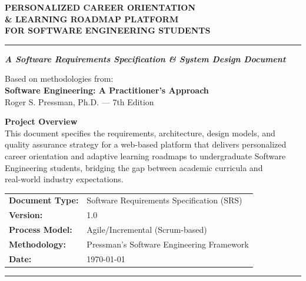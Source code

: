 \documentclass[12pt,a4paper]{report}
\begin{document}
	\begin{titlepage}
		\centering
		\vspace*{1.5cm}
		
		{\Huge\bfseries\color{primaryblue}
			PERSONALIZED CAREER ORIENTATION\\[0.4em]
			\& LEARNING ROADMAP PLATFORM\\[0.3em]
			FOR SOFTWARE ENGINEERING STUDENTS
			\par}
		
		\vspace{1cm}
		\rule{\textwidth}{1.5pt}
		
		\vspace{0.8cm}
		{\large\bfseries\textit{A Software Requirements Specification \& System Design Document}}
		
		\vspace{0.6cm}
		{\normalsize Based on methodologies from:}\\[0.3em]
		{\large\textbf{Software Engineering: A Practitioner's Approach}\\
			Roger S. Pressman, Ph.D. --- 7th Edition}
		
		\vspace{1.2cm}
		\begin{tcolorbox}[colback=lightgray, colframe=primaryblue, width=0.85\textwidth]
			\centering
			\textbf{Project Overview}\\[0.5em]
			This document specifies the requirements, architecture, design models, and\\
			quality assurance strategy for a web-based platform that delivers personalized\\
			career orientation and adaptive learning roadmaps to undergraduate Software\\
			Engineering students, bridging the gap between academic curricula and\\
			real-world industry expectations.
		\end{tcolorbox}
		
		\vfill
		
		{\normalsize
			\begin{tabular}{ll}
				\textbf{Document Type:}  & Software Requirements Specification (SRS) \\[3pt]
				\textbf{Version:}        & 1.0 \\[3pt]
				\textbf{Process Model:}  & Agile/Incremental (Scrum-based) \\[3pt]
				\textbf{Methodology:}    & Pressman's Software Engineering Framework \\[3pt]
				\textbf{Date:}           & \today \\
			\end{tabular}
		}
		
		\vspace{1.5cm}
		\rule{\textwidth}{0.5pt}
	\end{titlepage}
	
\end{document}
